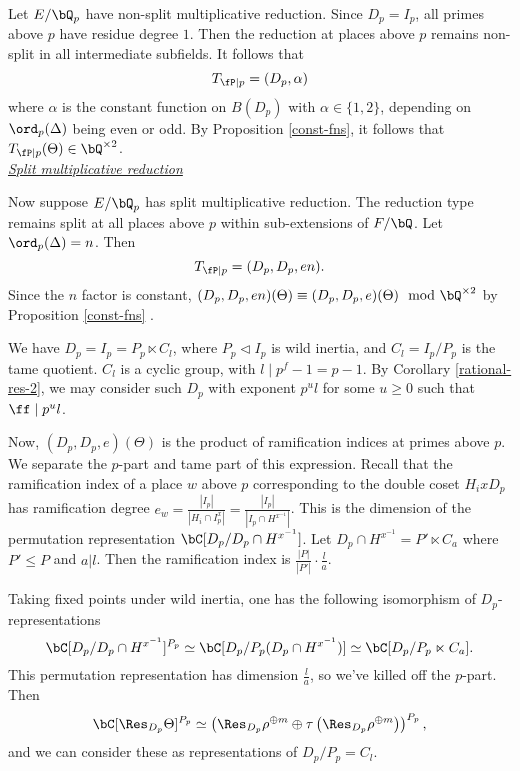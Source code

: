 Let $E / \bQ_p$ have non-split multiplicative reduction. Since $D_p = I_p$, all primes above $p$ have residue degree $1$. Then the reduction at places above $p$ remains non-split in all intermediate subfields.
It follows that 
\[ T_{\fP \mid p} = (D_p, \alpha) \]
where $\alpha$ is the constant function on $B(D_p)$ with $\alpha \in \{1, 2\}$, depending on $\ord_p(\Delta)$ being even or odd. By Proposition \ref{const-fns}, it follows that $T_{\fP \mid p}(\Theta) \in \bQ^{\times 2}$.\\  

\noindent\underline{\textit{Split multiplicative reduction}}

Now suppose $E / \bQ_p$ has split multiplicative reduction. The reduction type remains split at all places above $p$ within sub-extensions of $F / \bQ$. Let $\ord_p(\Delta) = n$. Then 
\[ T_{\fP \mid p} = (D_p, D_p, en). \]
Since the $n$ factor is constant, $(D_p, D_p, en)(\Theta) \equiv (D_p, D_p, e)(\Theta) \mod \bQ^{\times 2}$ by Proposition \ref{const-fns} .

We have $D_p = I_p = P_p \ltimes C_l$, where $P_p \triangleleft I_p$ is wild inertia, and $C_l = I_p / P_p$ is the tame quotient. $C_l$ is a cyclic group, with $l \mid p^f - 1 = p - 1$. By Corollary \ref{rational-res-2}, we may consider such $D_p$ with exponent  $p^u l$ for some $u \geq 0$ such that $\ff \mid p^u l$.

Now, $(D_p, D_p, e)(\Theta)$ is the product of ramification indices at primes above $p$. We separate the $p$-part and tame part of this expression.
Recall that the ramification index of a place $w$ above $p$ corresponding to the double coset $H_i x D_p$ has ramification degree $e_w = \frac{|I_p|}{|H_i \cap I_p^x|} =\frac{|I_p|}{|I_p \cap H^{x^{-1}}|}$.
This is the dimension of the permutation representation $\bC[D_p / D_p \cap H^{x^{-1}}]$.
Let  $D_p \cap H^{x^{-1}} = P' \ltimes C_a$ where $P' \leq P$ and $a | l$. Then the ramification index is $\frac{|P|}{|P'|}\cdot \frac{l}{a}$. 

Taking fixed points under wild inertia, one has the following isomorphism of $D_p$-representations  $$\bC[D_p / D_p \cap H^{x^{-1}}]^{P_p} \simeq \bC[D_p / P_p (D_p \cap H^{x^{-1}})] \simeq \bC[D_p / P_p \ltimes C_a].$$ This permutation representation has dimension $\frac{l}{a}$, so we've killed off the $p$-part. 
Then $$\bC[\Res_{D_p} \Theta]^{P_p} \simeq \left(\Res_{D_p} \rho^{\oplus m} \oplus \tau\left(\Res_{D_p}\rho^{\oplus m}\right)\right)^{P_p},$$
and we can consider these as representations of $D_p / P_p = C_l$.

